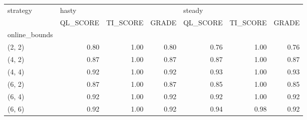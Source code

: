 \begin{tabular}{lrrrrrr}
\toprule
strategy & \multicolumn{3}{l}{hasty} & \multicolumn{3}{l}{steady} \\
{} & QL\_SCORE & TI\_SCORE & GRADE & QL\_SCORE & TI\_SCORE & GRADE \\
online\_bounds &          &          &       &          &          &       \\
\midrule
(2, 2)        &     0.80 &     1.00 &  0.80 &     0.76 &     1.00 &  0.76 \\
(4, 2)        &     0.87 &     1.00 &  0.87 &     0.87 &     1.00 &  0.87 \\
(4, 4)        &     0.92 &     1.00 &  0.92 &     0.93 &     1.00 &  0.93 \\
(6, 2)        &     0.87 &     1.00 &  0.87 &     0.85 &     1.00 &  0.85 \\
(6, 4)        &     0.92 &     1.00 &  0.92 &     0.92 &     1.00 &  0.92 \\
(6, 6)        &     0.92 &     1.00 &  0.92 &     0.94 &     0.98 &  0.92 \\
\bottomrule
\end{tabular}
